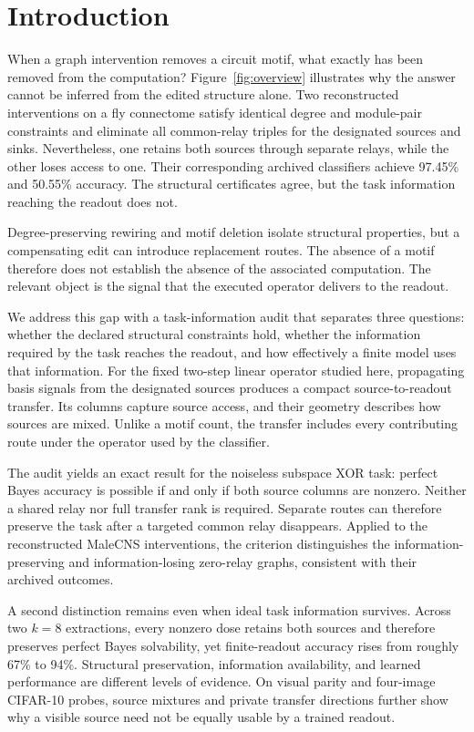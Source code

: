 \section{Introduction}
\label{sec:introduction}

When a graph intervention removes a circuit motif, what exactly has been
removed from the computation? Figure~\ref{fig:overview} illustrates why the
answer cannot be inferred from the edited structure alone. Two reconstructed
interventions on a fly connectome satisfy identical degree and module-pair
constraints and eliminate all common-relay triples for the designated sources
and sinks. Nevertheless, one retains both sources through separate relays,
while the other loses access to one. Their corresponding archived classifiers
achieve 97.45\% and 50.55\% accuracy. The structural certificates agree, but
the task information reaching the readout does not.

Degree-preserving rewiring and motif deletion isolate structural properties,
but a compensating edit can introduce replacement routes. The absence of a
motif therefore does not establish the absence of the associated computation.
The relevant object is the signal that the executed operator delivers to the
readout.

We address this gap with a task-information audit that separates three
questions: whether the declared structural constraints hold, whether the
information required by the task reaches the readout, and how effectively a
finite model uses that information. For the fixed two-step linear operator
studied here, propagating basis signals from the designated sources produces
a compact source-to-readout transfer. Its columns capture source access, and
their geometry describes how sources are mixed. Unlike a motif count, the
transfer includes every contributing route under the operator used by the
classifier.

The audit yields an exact result for the noiseless subspace XOR task: perfect
Bayes accuracy is possible if and only if both source columns are nonzero.
Neither a shared relay nor full transfer rank is required. Separate routes
can therefore preserve the task after a targeted common relay disappears.
Applied to the reconstructed MaleCNS interventions, the criterion
distinguishes the information-preserving and information-losing zero-relay
graphs, consistent with their archived outcomes.

A second distinction remains even when ideal task information survives.
Across two $k{=}8$ extractions, every nonzero dose retains both sources and
therefore preserves perfect Bayes solvability, yet finite-readout accuracy
rises from roughly 67\% to 94\%. Structural preservation, information
availability, and learned performance are different levels of evidence. On
visual parity and four-image CIFAR-10 probes, source mixtures and private
transfer directions further show why a visible source need not be equally
usable by a trained readout.

